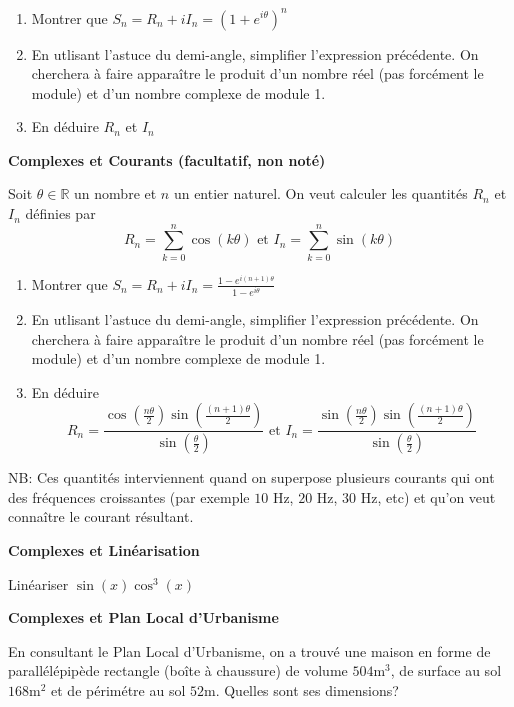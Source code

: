 \documentclass[a4paper,12pt]{article}\usepackage[]{graphicx}\usepackage[]{color}
\begin{document}
\begin{enumerate}
\item Montrer que $\displaystyle S_n = R_n + i I_n = (1+e^{i\theta})^n$
\item En utlisant l'astuce du demi-angle, simplifier l'expression précédente. On cherchera à faire apparaître le produit d'un nombre réel (pas forcément le module) et d'un nombre complexe de module 1. 
\item En déduire $R_n$ et $I_n$
\end{enumerate}

\Exo \textbf{Complexes et Courants (facultatif, non noté)}

Soit $\theta \in \mathbb{R}$ un nombre et $n$ un entier naturel. On veut calculer les quantités $R_n$ et $I_n$ définies par 
\begin{equation*}
R_n  = \sum_{k=0}^n \cos(k\theta) \text{ et } I_n  = \sum_{k=0}^n \sin(k\theta)
\end{equation*}

\begin{enumerate}
\item Montrer que $\displaystyle S_n = R_n + i I_n = \frac{1 - e^{i(n+1)\theta}}{1 - e^{i\theta}}$
\item En utlisant l'astuce du demi-angle, simplifier l'expression précédente. On cherchera à faire apparaître le produit d'un nombre réel (pas forcément le module) et d'un nombre complexe de module 1. 
\item En déduire 
$$ R_n = \frac{\cos\left(\frac{n\theta}{2}\right)\sin\left(\frac{(n+1)\theta}{2}\right)}{\sin\left(\frac{\theta}{2}\right)} \text{ et } I_n = \frac{\sin\left(\frac{n\theta}{2}\right)\sin\left(\frac{(n+1)\theta}{2}\right)}{\sin\left(\frac{\theta}{2}\right)} $$
\end{enumerate}

NB: Ces quantités interviennent quand on superpose plusieurs courants qui ont des fréquences croissantes (par exemple $10$ Hz, $20$ Hz, $30$ Hz, etc) et qu'on veut connaître le courant résultant.

\Exo \textbf{Complexes et Linéarisation}

Linéariser $\sin(x)\cos^3(x)$

\Exo \textbf{Complexes et Plan Local d'Urbanisme}

En consultant le Plan Local d'Urbanisme, on a trouvé une maison en forme de parallélépipède rectangle (boîte à chaussure) de volume $504$m$^3$, de surface au sol $168$m$^2$ et de périmétre au sol $52$m. Quelles sont ses dimensions?
\end{document}
